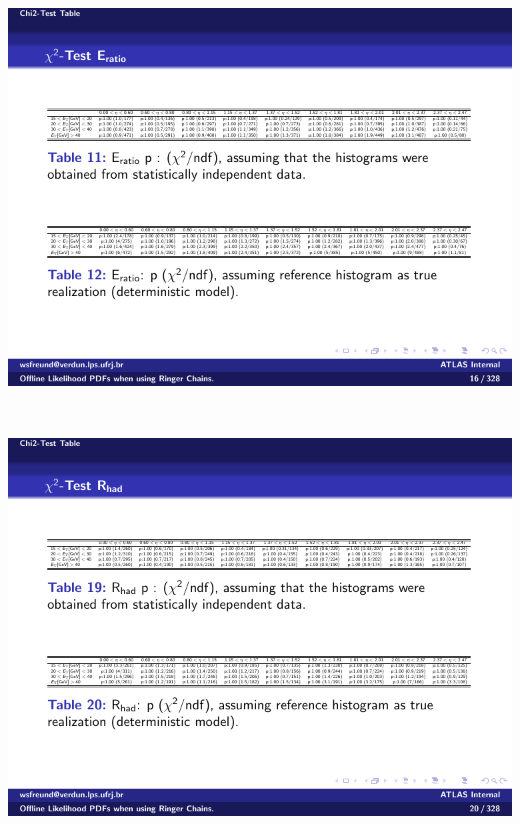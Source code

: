 \begin{table}[p]
\begin{subtable}{\textwidth}
\end{subtable} \\
\begin{subtable}{\textwidth}
\caption{\eratio{}\label{tab:gof_chi2_p_values_eratio}}
\includegraphics[width=\textwidth]{appendices/figures/gof/eratio_chi2_table.pdf}
\end{subtable} \\
\begin{subtable}{\textwidth}
\caption{\rhad{}\label{tab:gof_chi2_p_values_rhad}}
\includegraphics[width=\textwidth]{appendices/figures/gof/rhad_chi2_table.pdf}
\end{subtable} \\
\begin{subtable}{\textwidth}

\end{subtable}
\end{table}
